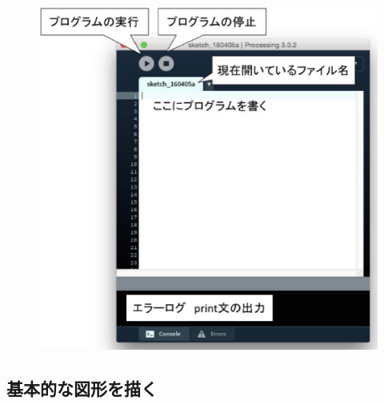 \documentclass[11pt,a4paper]{jarticle}
\begin{document}
\begin{figure}[h!]
 \centering
 \includegraphics[width=0.35\columnwidth]{processing_ide.eps}
\end{figure}

\subsection*{基本的な図形を描く}
\end{document}
